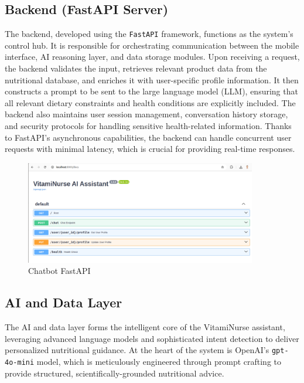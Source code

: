 \subsection{Backend (FastAPI Server)}
The backend, developed using the \texttt{FastAPI} framework, functions as the system’s control hub. It is responsible for orchestrating communication between the mobile interface, AI reasoning layer, and data storage modules. Upon receiving a request, the backend validates the input, retrieves relevant product data from the nutritional database, and enriches it with user-specific profile information. It then constructs a prompt to be sent to the large language model (LLM), ensuring that all relevant dietary constraints and health conditions are explicitly included. The backend also maintains user session management, conversation history storage, and security protocols for handling sensitive health-related information. Thanks to FastAPI’s asynchronous capabilities, the backend can handle concurrent user requests with minimal latency, which is crucial for providing real-time responses.
 \begin{center}
    \begin{figure}[H]
    \includegraphics[width=0.9\textwidth]{images/chatbot_API.png}
    \caption{Chatbot FastAPI} 
    \label{fig:chatbot API}
\end{figure}
\end{center}

\subsection{AI and Data Layer}
The AI and data layer forms the intelligent core of the VitamiNurse assistant, leveraging advanced language models and sophisticated intent detection to deliver personalized nutritional guidance. At the heart of the system is OpenAI's \texttt{gpt-4o-mini} model, which is meticulously engineered through prompt crafting to provide structured, scientifically-grounded nutritional advice.

